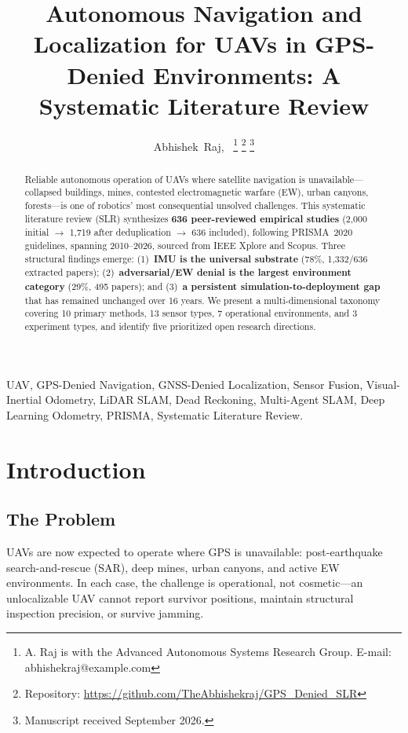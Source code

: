 \documentclass[journal]{IEEEtran}
\title{Autonomous Navigation and Localization for UAVs in GPS-Denied
       Environments: A Systematic Literature Review}
\author{Abhishek~Raj,~\IEEEmembership{Member,~IEEE}
\thanks{A. Raj is with the Advanced Autonomous Systems Research Group.
E-mail: abhishekraj@example.com}
\thanks{Repository: \url{https://github.com/TheAbhishekraj/GPS_Denied_SLR}}
\thanks{Manuscript received September 2026.}}
\begin{document}
\maketitle

\begin{abstract}
Reliable autonomous operation of UAVs where satellite navigation is
unavailable---collapsed buildings, mines, contested electromagnetic warfare
(EW), urban canyons, forests---is one of robotics' most consequential unsolved
challenges. This systematic literature review (SLR) synthesizes
\textbf{636 peer-reviewed empirical studies} (2,000 initial $\rightarrow$
1,719 after deduplication $\rightarrow$ 636 included), following PRISMA~2020
guidelines, spanning 2010--2026, sourced from IEEE Xplore and Scopus. Three
structural findings emerge: (1)~\textbf{IMU is the universal substrate}
(78\%, 1,332/636 extracted papers); (2)~\textbf{adversarial/EW denial is
the largest environment category} (29\%, 495 papers); and
(3)~\textbf{a persistent simulation-to-deployment gap} that has remained
unchanged over 16 years. We present a multi-dimensional taxonomy covering 10
primary methods, 13 sensor types, 7 operational environments, and 3 experiment
types, and identify five prioritized open research directions.
\end{abstract}

\begin{IEEEkeywords}
UAV, GPS-Denied Navigation, GNSS-Denied Localization, Sensor Fusion,
Visual-Inertial Odometry, LiDAR SLAM, Dead Reckoning, Multi-Agent SLAM,
Deep Learning Odometry, PRISMA, Systematic Literature Review.
\end{IEEEkeywords}

\section{Introduction}
\label{sec:intro}

\subsection{The Problem}
UAVs are now expected to operate where GPS is unavailable: post-earthquake
search-and-rescue (SAR), deep mines, urban canyons, and active EW
environments. In each case, the challenge is operational, not cosmetic---an
unlocalizable UAV cannot report survivor positions, maintain structural
inspection precision, or survive jamming.
\end{document}
